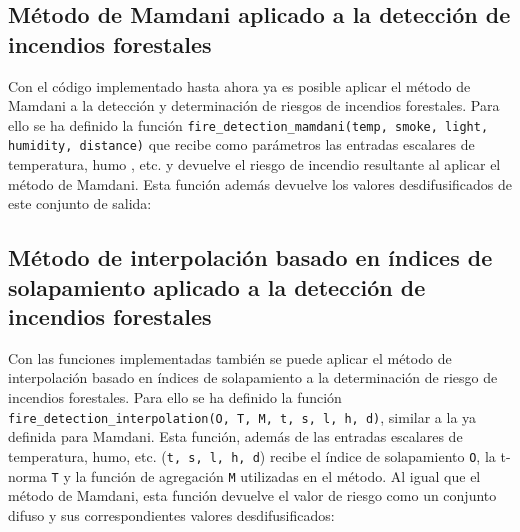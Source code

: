 \lstset{linewidth=18cm}


\subsection{Método de Mamdani aplicado a la detección de incendios forestales}
Con el código implementado hasta ahora ya es posible aplicar el método de Mamdani a la detección y determinación de riesgos de incendios forestales. Para ello se ha definido la función \lstinline|fire_detection_mamdani(temp, smoke, light, humidity, distance)| que recibe como parámetros las entradas escalares de temperatura, humo , etc. y devuelve el riesgo de incendio resultante al aplicar el método de Mamdani. Esta función además devuelve los valores desdifusificados de este conjunto de salida:



\subsection{Método de interpolación basado en índices de solapamiento aplicado a la detección de incendios forestales}
Con las funciones implementadas también se puede aplicar el método de interpolación basado en índices de solapamiento a la determinación de riesgo de incendios forestales. Para ello se ha definido la función \lstinline|fire_detection_interpolation(O, T, M, t, s, l, h, d)|, similar a la ya definida para Mamdani. Esta función, además de las entradas escalares de temperatura, humo, etc. (\lstinline|t, s, l, h, d|) recibe el índice de solapamiento \lstinline|O|, la t-norma \lstinline|T| y la función de agregación \lstinline|M| utilizadas en el método. Al igual que el método de Mamdani, esta función devuelve el valor de riesgo como un conjunto difuso y sus correspondientes valores desdifusificados:


